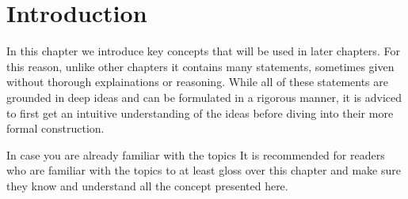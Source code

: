
\chapter{Introduction}\label{chapter:intro}
In this chapter we introduce key concepts that will be used in later chapters. For this reason, unlike other chapters it contains many statements, sometimes given without thorough explainations or reasoning. While all of these statements are grounded in deep ideas and can be formulated in a rigorous manner, it is adviced to first get an intuitive understanding of the ideas before diving into their more formal construction.

\vspace{2em}
\begin{note}{In case you are already familiar with the topics}{}
	It is recommended for readers who are familiar with the topics to at least gloss over this chapter and make sure they know and understand all the concept presented here.
\end{note}
